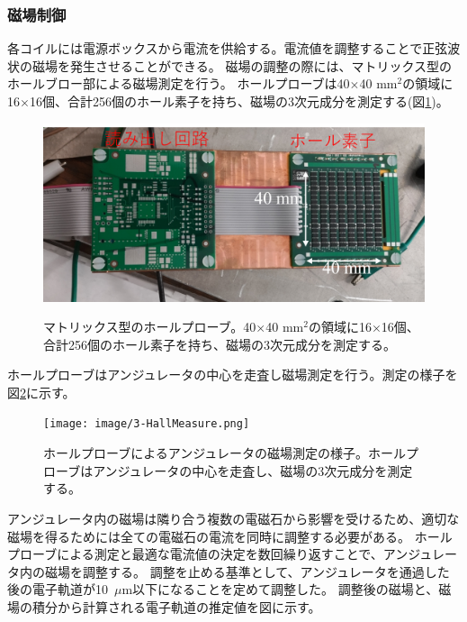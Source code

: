 \documentclass[a4paper,11pt,uplatex]{jsbook}
\begin{document}
\subsubsection{磁場制御}
各コイルには電源ボックスから電流を供給する。電流値を調整することで正弦波状の磁場を発生させることができる。
磁場の調整の際には、マトリックス型のホールブロー部による磁場測定を行う。
ホールプローブは40$\times$40 mm$^2$の領域に16$\times$16個、合計256個のホール素子を持ち、磁場の3次元成分を測定する(図\ref{hall})。
\begin{figure}
  \centering
  \includegraphics[width=0.8\linewidth]{image/3-hallmatrix.png}\\
  \caption[ホールプローブ]{マトリックス型のホールプローブ。40$\times$40 mm$^2$の領域に16$\times$16個、合計256個のホール素子を持ち、磁場の3次元成分を測定する。}
  \label{hall}
\end{figure}
ホールプローブはアンジュレータの中心を走査し磁場測定を行う。測定の様子を図\ref{hallscan}に示す。
\begin{figure}
  \centering
  \texttt{[image: image/3-HallMeasure.png]}\\
  \caption[ホールプローブの走査]{ホールプローブによるアンジュレータの磁場測定の様子。ホールプローブはアンジュレータの中心を走査し、磁場の3次元成分を測定する。}
  \label{hallscan}
\end{figure}
アンジュレータ内の磁場は隣り合う複数の電磁石から影響を受けるため、適切な磁場を得るためには全ての電磁石の電流を同時に調整する必要がある。
ホールプローブによる測定と最適な電流値の決定を数回繰り返すことで、アンジュレータ内の磁場を調整する。
調整を止める基準として、アンジュレータを通過した後の電子軌道が10~$\mu$m以下になることを定めて調整した。
調整後の磁場と、磁場の積分から計算される電子軌道の推定値を図に示す。
\end{document}
